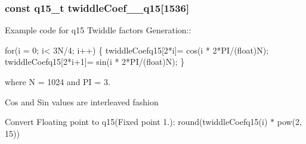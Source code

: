 \subsubsection[{\texorpdfstring{twiddle\+Coef\+\_\+1024\+\_\+q15}{twiddleCoef_1024_q15}}]{\setlength{\rightskip}{0pt plus 5cm}const q15\+\_\+t twiddle\+Coef\+\_\+\_\+q15\mbox{[}1536\mbox{]}}\hypertarget{group__CFFT__CIFFT_ga8a0ec95d866fe96b740e77d6e1356b59}{}\label{group__CFFT__CIFFT_ga8a0ec95d866fe96b740e77d6e1356b59}
\begin{DoxyParagraph}{}
Example code for q15 Twiddle factors Generation\+:\+: 
\end{DoxyParagraph}
\begin{DoxyParagraph}{}

\begin{DoxyPre}for(i = 0; i< 3N/4; i++)
\{
   twiddleCoefq15[2*i]= cos(i * 2*PI/(float)N);
   twiddleCoefq15[2*i+1]= sin(i * 2*PI/(float)N);
\} \end{DoxyPre}
 
\end{DoxyParagraph}
\begin{DoxyParagraph}{}
where N = 1024 and PI = 3. 
\end{DoxyParagraph}
\begin{DoxyParagraph}{}
Cos and Sin values are interleaved fashion 
\end{DoxyParagraph}
\begin{DoxyParagraph}{}
Convert Floating point to q15(Fixed point 1.)\+: round(twiddle\+Coefq15(i) $\ast$ pow(2, 15)) 
\end{DoxyParagraph}
